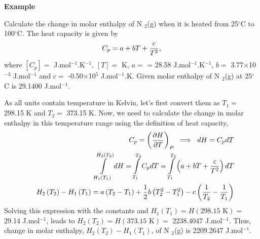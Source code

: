    \begin{MyExample}{\begin{center}{\bf Example}\end{center}}
     \begin{example}\label{Chapter:FirstLaw:Example4}\citep{Atkins_Book}
       Calculate the change in molar enthalpy of N $_{2}$(g) when it is heated from 25$^{\circ}$C to 100$^{\circ}$C. The heat capacity is given by
       \begin{displaymath}
         C_{p} = a + bT + \displaystyle\frac{c}{T^{2}}, 
       \end{displaymath}
       where $\left[C_{p}\right]=$ J.mol$^{-1}$.K$^{-1}$, $\left[T\right]=$ K, $a=$ = 28.58 J.mol$^{-1}$.K$^{-1}$, $b=$ 3.77$\times$10$^{-3}$ J.mol$^{-1}$ and $c=$ -0.50$\times$10$^{5}$ J.mol$^{-1}$.K. Given molar enthalpy of N $_{2}$(g) at 25$^{\circ}$C is 29.1400 J.mol$^{-1}$.
     \end{example}
     
      As all units contain temperature in Kelvin, let's first convert them as $T_{1}=$ 298.15 K and $T_{2}=$ 373.15 K. Now, we need to calculate the change in molar enthalpy in this temperature range using the definition of heat capacity,
        \begin{eqnarray}
          && C_{p} = \left(\displaystyle\frac{\partial H}{\partial T}\right)_{P} \;\;\Longrightarrow\;\; dH = C_{p}dT \nonumber \\
          && \int\limits_{H_{1}\left(T_{1}\right)}^{H_{2}\left(T_{2}\right)}dH = \int\limits_{T_{1}}^{T_{2}} C_{p}dT = \int\limits_{T_{1}}^{T_{2}} \left(a + bT + \displaystyle\frac{c}{T^{2}}\right)dT \nonumber \\
          && H_{2}\left(T_{2}\right) - H_{1}\left(T_{1}\right) = a\left(T_{2}-T_{1}\right) + \displaystyle\frac{1}{2}b\left(T_{2}^{2}-T_{1}^{2}\right) - c\left(\displaystyle\frac{1}{T_{2}}-\displaystyle\frac{1}{T_{1}}\right) \nonumber 
        \end{eqnarray}
        Solving this expression with the constants and $H_{1}\left(T_{1}\right)=H\left(\text{298.15 K}\right)=$ 29.14 J.mol$^{-1}$, leads to $H_{2}\left(T_{2}\right) = H\left(\text{373.15 K}\right)=$ 2238.4047 J.mol$^{-1}$. Thus, change in molar enthalpy, \ie $H_{2}\left(T_{2}\right) - H_{1}\left(T_{1}\right)$,  of N $_{2}$(g) is 2209.2647 J.mol$^{-1}$.

   \end{MyExample} 
       
      
